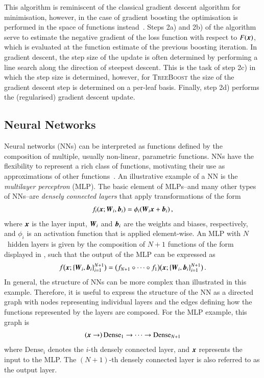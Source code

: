 This algorithm is reminiscent of the classical gradient descent algorithm for
minimisation, however, in the case of gradient boosting the optimisation is
performed in the space of functions instead~\cite{Friedman:2001wbq}. Steps 2a)
and 2b) of the algorithm serve to estimate the negative gradient of the loss
function with respect to $F(\myvec{x})$, which is evaluated at the function
estimate of the previous boosting iteration. In gradient descent, the step size
of the update is often determined by performing a line search along the
direction of steepest descent. This is the task of step 2c) in which the step
size is determined, however, for \textsc{TreeBoost} the size of the gradient
descent step is determined on a per-leaf basis. Finally, step 2d) performs the
(regularised) gradient descent update.


\subsection{Neural Networks}%
\label{sec:neural_networks}

Neural networks (NNs) can be interpreted as functions defined by the composition
of multiple, usually non-linear, parametric functions. NNs have the flexibility
to represent a rich class of functions, motivating their use as approximations
of other functions~\cite{hornik1989multilayer}. An illustrative example of a NN
is the \emph{multilayer perceptron} (MLP). The basic element of MLPs--and many
other types of NNs--are \emph{densely connected layers} that apply
transformations of the form
\begin{align}
  f_i(\myvec{x}; \myvec{W}_i, \myvec{b}_i) = \phi_i(\myvec{W}_i \myvec{x} + \myvec{b}_i) \,\text{,}
  \label{eq:dense_layer}
\end{align}
where $\myvec{x}$ is the layer input, $\myvec{W}_i$ and $\myvec{b}_i$ are the
weights and biases, respectively, and $\phi_i$ is an activation function that is
applied element-wise. An MLP with $N$~hidden layers is given by the composition
of $N + 1$ functions of the form displayed in , such that
the output of the MLP can be expressed as
\begin{align*}
  f\bigl( \myvec{x}; \{\myvec{W}_{i},\myvec{b}_{i} \}_{i=1}^{N+1} \bigr)
  = \bigl( f_{N+1} \circ \dots \circ f_{1} \bigr)
  \bigl( \myvec{x}; \{\myvec{W}_i, \myvec{b}_i\}_{i=1}^{N+1} \bigr)
  \,\text{.}
\end{align*}
In general, the structure of NNs can be more complex than illustrated in this
example. Therefore, it is useful to express the structure of the NN as a
directed graph with nodes representing individual layers and the edges defining
how the functions represented by the layers are composed. For the MLP example,
this graph is
\begin{align*}
  (\myvec{x} \to) \, \text{Dense}_{1} \to \dots \to \text{Dense}_{N + 1}
\end{align*}
where $\text{Dense}_{i}$ denotes the $i$-th densely connected layer, and
$\myvec{x}$ represents the input to the MLP. The $(N+1)$-th densely connected
layer is also referred to as the output layer.

